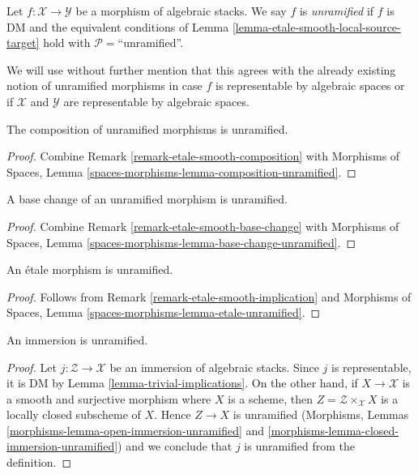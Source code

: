 \begin{definition}
\label{definition-unramified}
Let $f : \mathcal{X} \to \mathcal{Y}$ be a morphism of algebraic stacks.
We say $f$ is {\it unramified} if $f$ is DM and the equivalent conditions of
Lemma \ref{lemma-etale-smooth-local-source-target}
hold with $\mathcal{P} =$``unramified''.
\end{definition}

\noindent
We will use without further mention that this agrees with the already
existing notion of unramified morphisms in case $f$ is representable
by algebraic spaces or if $\mathcal{X}$ and $\mathcal{Y}$ are
representable by algebraic spaces.

\begin{lemma}
\label{lemma-composition-unramified}
The composition of unramified morphisms is unramified.
\end{lemma}

\begin{proof}
Combine Remark \ref{remark-etale-smooth-composition}
with
Morphisms of Spaces, Lemma \ref{spaces-morphisms-lemma-composition-unramified}.
\end{proof}

\begin{lemma}
\label{lemma-base-change-unramified}
A base change of an unramified morphism is unramified.
\end{lemma}

\begin{proof}
Combine
Remark \ref{remark-etale-smooth-base-change}
with
Morphisms of Spaces, Lemma \ref{spaces-morphisms-lemma-base-change-unramified}.
\end{proof}

\begin{lemma}
\label{lemma-etale-unramified}
An \'etale morphism is unramified.
\end{lemma}

\begin{proof}
Follows from Remark \ref{remark-etale-smooth-implication}
and Morphisms of Spaces, Lemma
\ref{spaces-morphisms-lemma-etale-unramified}.
\end{proof}

\begin{lemma}
\label{lemma-immersion-unramified}
An immersion is unramified.
\end{lemma}

\begin{proof}
Let $j : \mathcal{Z} \to \mathcal{X}$ be an immersion of
algebraic stacks. Since $j$ is representable, it is DM by
Lemma \ref{lemma-trivial-implications}. On the other hand,
if $X \to \mathcal{X}$ is a smooth and surjective morphism
where $X$ is a scheme, then $Z = \mathcal{Z} \times_\mathcal{X} X$
is a locally closed subscheme of $X$. Hence $Z \to X$ is unramified
(Morphisms, Lemmas \ref{morphisms-lemma-open-immersion-unramified} and
\ref{morphisms-lemma-closed-immersion-unramified})
and we conclude that $j$ is unramified from the definition.
\end{proof}

